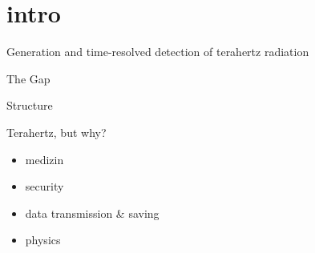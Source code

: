 \section{intro}
\begin{frame}{Generation and time-resolved detection of
    terahertz radiation}
\end{frame}

\begin{frame}{The Gap}
\end{frame}

\begin{frame}{Structure}
    \tableofcontents
\end{frame}

\begin{frame}{Terahertz, but why?}
    \begin{itemize}
        \item medizin
        \item security
        \item data transmission & saving
        \item physics 
    \end{itemize}
\end{frame}